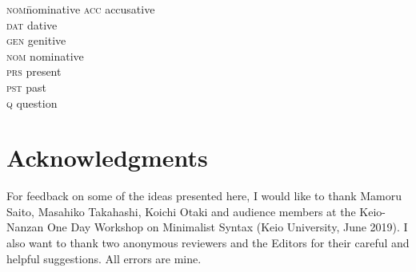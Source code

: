 \documentclass[output=paper]{langscibook}
\begin{document}
\begin{multicols}{4}
\begin{tabbing}
\textsc{nom}\hspace{1ex}\= nominative \kill
\textsc{acc} \> accusative  \\
\textsc{dat} \> dative     \\
\textsc{gen} \> genitive  \\
\textsc{nom} \> nominative \\        
\textsc{prs} \> present  \\
\textsc{pst} \> past     \\
\textsc{q}   \> question
\end{tabbing}
\end{multicols}

\section*{Acknowledgments}

For feedback on some of the ideas presented here, I would like to thank Mamoru Saito, Masahiko Takahashi, Koichi Otaki and audience members at the Keio-Nanzan One Day Workshop on Minimalist Syntax (Keio University, June 2019). I also want to thank two anonymous reviewers and the Editors for their careful and helpful suggestions. All errors are mine. 

{\sloppy\printbibliography[heading=subbibliography,notkeyword=this]}
\end{document}

